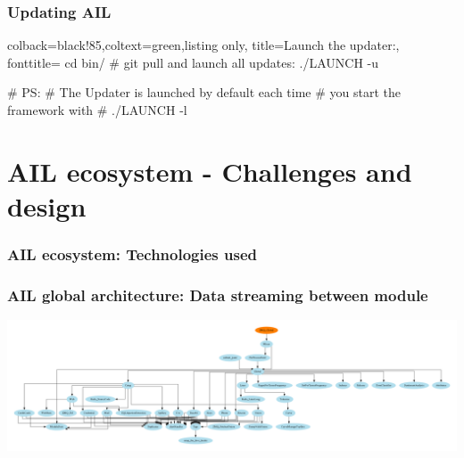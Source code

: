 \documentclass{beamer}
\begin{document}

\begin{frame}[fragile]
    \frametitle{Updating AIL}
    \begin{tcblisting}{colback=black!85,coltext=green,listing only,
        title=Launch the updater:, fonttitle=\bfseries}
cd bin/
# git pull and launch all updates:
./LAUNCH -u


# PS:
# The Updater is launched by default each time
# you start the framework with
# ./LAUNCH -l
\end{tcblisting}

\end{frame}


\section{AIL ecosystem - Challenges and design}
\begin{frame}
    \frametitle{AIL ecosystem: Technologies used}
\end{frame}


\begin{frame}
    \frametitle{AIL global architecture: Data streaming between module}
    \centerline{\includegraphics[scale=0.15]{images/module-data-flow.png}}
\end{frame}
\end{document}
